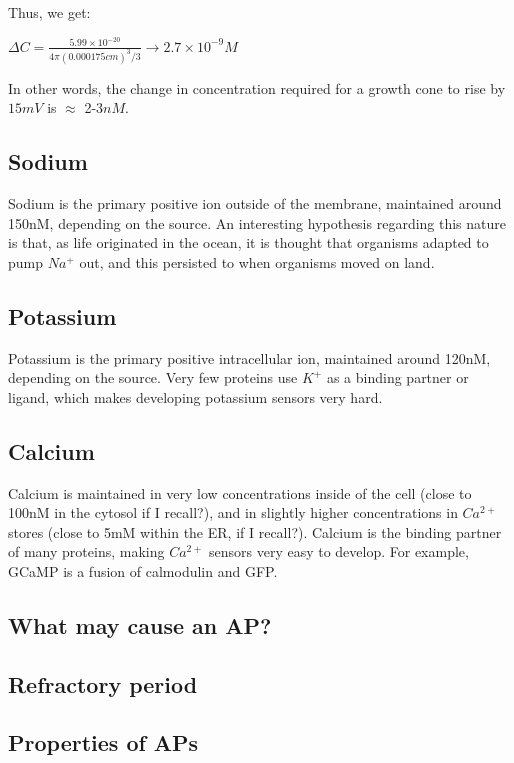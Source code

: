\documentclass[12pt]{amsart}
\begin{document}
\bigskip

    Thus, we get:

    \bigskip
    
\begin{center}

    $\Delta C = \frac{5.99\times10^{-20}}{4\pi (0.000175cm)^3 /3} \rightarrow 2.7 \times10^{-9} M$
    
\end{center}

\bigskip

In other words, the change in concentration required for a growth cone to rise by $15mV$ is $\approx$ 2-3$nM$.  



\subsection{Sodium} Sodium is the primary positive ion outside of the membrane, maintained around 150nM, depending on the source. An interesting hypothesis regarding this nature is that, as life originated in the ocean, it is thought that organisms adapted to pump $Na^+$ out, and this persisted to when organisms moved on land.  
\subsection{Potassium} Potassium is the primary positive intracellular ion, maintained around 120nM, depending on the source. Very few proteins use $K^+$ as a binding partner or ligand, which makes developing potassium sensors very hard. 
\subsection{Calcium} Calcium is maintained in very low concentrations inside of the cell (close to 100nM in the cytosol if I recall?), and in slightly higher concentrations in $Ca^{2+}$ stores (close to 5mM within the ER, if I recall?). Calcium is the binding partner of many proteins, making $Ca^{2+}$ sensors very easy to develop. For example, GCaMP is a fusion of calmodulin and GFP. 
\subsection{What may cause an AP?}
\subsection{Refractory period}
\subsection{Properties of APs}
\end{document}
